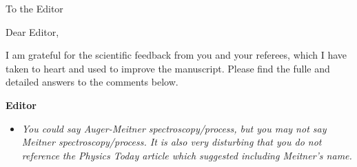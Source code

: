 \documentclass[DIN,pagenumber=false,parskip=half,fromalign=left,fromphone=false,fromemail=true,fromurl=false,fromlogo=false,fromrule=false]{scrlttr2}
\begin{document}
\begin{letter}{To the Editor}
	
	\opening{Dear Editor,}

I am grateful for the scientific feedback from you and your referees, which I
have taken to heart and
used to improve the manuscript. Please find the fulle and detailed answers to the
comments below.

\textbf{Editor}
\begin{itemize}
 \item \emph{You could say
             Auger-Meitner spectroscopy/process, but you may not say Meitner
             spectroscopy/process. It is also very disturbing that you do not reference
             the Physics Today article which suggested including Meitner's name.}\\

\end{itemize}
\end{letter}
\end{document}
